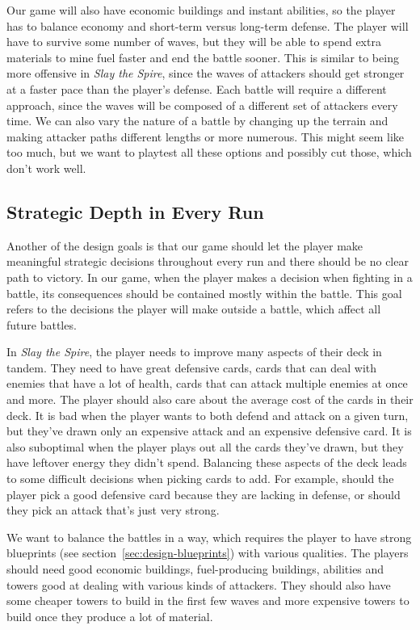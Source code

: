 Our game will also have economic buildings and instant abilities, so the player has to balance economy and short-term versus long-term defense.
The player will have to survive some number of waves, but they will be able to spend extra materials to mine fuel faster and end the battle sooner.
This is similar to being more offensive in \emph{Slay the Spire}, since the waves of attackers should get stronger at a faster pace than the player's defense.
Each battle will require a different approach, since the waves will be composed of a different set of attackers every time.
We can also vary the nature of a battle by changing up the terrain and making attacker paths different lengths or more numerous.
This might seem like too much, but we want to playtest all these options and possibly cut those, which don't work well.

\subsection{Strategic Depth in Every Run} \label{sec:goal-depth-run}

Another of the design goals is that our game should let the player make meaningful strategic decisions throughout every run and there should be no clear path to victory.
In our game, when the player makes a decision when fighting in a battle, its consequences should be contained mostly within the battle.
This goal refers to the decisions the player will make outside a battle, which affect all future battles.

In \emph{Slay the Spire}, the player needs to improve many aspects of their deck in tandem.
They need to have great defensive cards, cards that can deal with enemies that have a lot of health, cards that can attack multiple enemies at once and more.
The player should also care about the average cost of the cards in their deck.
It is bad when the player wants to both defend and attack on a given turn, but they've drawn only an expensive attack and an expensive defensive card.
It is also suboptimal when the player plays out all the cards they've drawn, but they have leftover energy they didn't spend.
Balancing these aspects of the deck leads to some difficult decisions when picking cards to add.
For example, should the player pick a good defensive card because they are lacking in defense, or should they pick an attack that's just very strong.

We want to balance the battles in a way, which requires the player to have strong blueprints (see section~\ref{sec:design-blueprints}) with various qualities.
The players should need good economic buildings, fuel-producing buildings, abilities and towers good at dealing with various kinds of attackers.
They should also have some cheaper towers to build in the first few waves and more expensive towers to build once they produce a lot of material.

